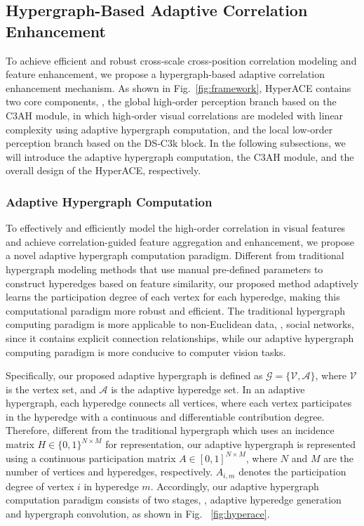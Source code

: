 \subsection{Hypergraph-Based Adaptive Correlation Enhancement}
\label{sec:HyperACE}

To achieve efficient and robust cross‐scale cross‐position correlation modeling and feature enhancement, we propose a hypergraph-based adaptive correlation enhancement mechanism. As shown in Fig.~\ref{fig:framework}, HyperACE contains two core components, \ie, the global high‐order perception branch based on the C3AH module, in which high‐order visual correlations are modeled with linear complexity using adaptive hypergraph computation, and the local low‐order perception branch based on the DS‐C3k block. In the following subsections, we will introduce the adaptive hypergraph computation, the C3AH module, and the overall design of the HyperACE, respectively.

\subsubsection{Adaptive Hypergraph Computation}
To effectively and efficiently model the high-order correlation in visual features and achieve correlation-guided feature aggregation and enhancement, we propose a novel adaptive hypergraph computation paradigm. Different from traditional hypergraph modeling methods that use manual pre-defined parameters to construct hyperedges based on feature similarity, our proposed method adaptively learns the participation degree of each vertex for each hyperedge, making this computational paradigm more robust and efficient. The traditional hypergraph computing paradigm is more applicable to non-Euclidean data, \eg, social networks, since it contains explicit connection relationships, while our adaptive hypergraph computing paradigm is more conducive to computer vision tasks. 

Specifically, our proposed adaptive hypergraph is defined as $\mathcal{G}= \{\mathcal{V}, \mathcal{A}\}$, where $\mathcal{V}$ is the vertex set, and $\mathcal{A}$ is the adaptive hyperedge set. In an adaptive hypergraph, each hyperedge connects all vertices, where each vertex participates in the hyperedge with a continuous and differentiable contribution degree. Therefore, different from the traditional hypergraph which uses an incidence matrix $H \in \{0,1\}^{N \times M}$ for representation, our adaptive hypergraph is represented using a continuous participation matrix $A \in [0,1]^{N \times M}$, where $N$ and $M$ are the number of vertices and hyperedges, respectively. $A_{i,m}$ denotes the participation degree of vertex $i$ in hyperedge $m$. Accordingly, our adaptive hypergraph computation paradigm consists of two stages, \ie, adaptive hyperedge generation and hypergraph convolution, as shown in Fig.~ \ref{fig:hyperace}.


